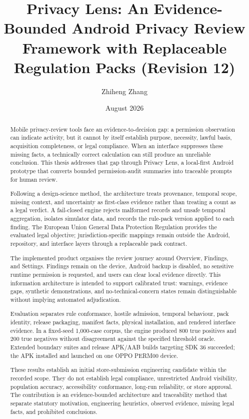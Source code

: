 \documentclass[11pt,a4paper]{article}
\title{Privacy Lens: An Evidence-Bounded Android Privacy Review Framework with Replaceable Regulation Packs (Revision 12)}
\author{Zhiheng Zhang}
\date{August 2026}
\begin{document}
\maketitle
\begin{abstract}
Mobile privacy-review tools face an evidence-to-decision gap: a permission observation can indicate activity, but it cannot by itself establish purpose, necessity, lawful basis, acquisition completeness, or legal compliance. When an interface suppresses these missing facts, a technically correct calculation can still produce an unreliable conclusion. This thesis addresses that gap through Privacy Lens, a local-first Android prototype that converts bounded permission-audit summaries into traceable prompts for human review.

Following a design-science method, the architecture treats provenance, temporal scope, missing context, and uncertainty as first-class evidence rather than treating a count as a legal verdict. A fail-closed engine rejects malformed records and unsafe temporal aggregation, isolates simulator data, and records the rule-pack version applied to each finding. The European Union General Data Protection Regulation provides the evaluated legal objective; jurisdiction-specific mappings remain outside the Android, repository, and interface layers through a replaceable pack contract.

The implemented product organises the review journey around Overview, Findings, and Settings. Findings remain on the device, Android backup is disabled, no sensitive runtime permission is requested, and users can clear local evidence directly. This information architecture is intended to support calibrated trust: warnings, evidence gaps, synthetic demonstrations, and no-technical-concern states remain distinguishable without implying automated adjudication.

Evaluation separates rule conformance, hostile admission, temporal behaviour, pack identity, release packaging, manifest facts, physical installation, and rendered interface evidence. In a fixed-seed 1,000-case corpus, the engine produced 800 true positives and 200 true negatives without disagreement against the specified threshold oracle. Extended boundary suites and release APK/AAB builds targeting SDK 36 succeeded; the APK installed and launched on one OPPO PERM00 device.

These results establish an initial store-submission engineering candidate within the recorded scope. They do not establish legal compliance, unrestricted Android visibility, population accuracy, accessibility conformance, long-run reliability, or store approval. The contribution is an evidence-bounded architecture and traceability method that separate statutory motivation, engineering heuristics, observed evidence, missing legal facts, and prohibited conclusions.
\end{abstract}
\newpage
\tableofcontents
\newpage









\end{document}
